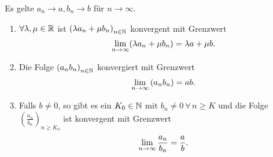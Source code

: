 \documentclass[../ana1.tex]{subfiles}
\begin{document}
\begin{satz}
	Es gelte \(a_n\rightarrow a, b_n \rightarrow b \) für \(n\rightarrow\infty \).
	\begin{enumerate}
		\item \(\forall \lambda, \mu \in\mathbb{R} \) ist \( {(\lambda a_n + \mu b_n)}_{n\in\mathbb{N}} \) konvergent mit Grenzwert
		\[\lim\limits_{n\rightarrow\infty} (\lambda a_n + \mu b_n) = \lambda a + \mu b. \]
		\item Die Folge \( {(a_n b_n)}_{n\in\mathbb{N}} \) konvergiert mit Grenzwert
		\[\lim\limits_{n\rightarrow\infty} {(a_n b_n)} = ab. \]
		\item Falls \(b\neq 0 \), so gibt es ein \(K_0 \in\mathbb{N} \) mit \(b_n \neq 0 \, \forall \, n\geq K \) und die Folge \( {\left(\frac{a_n}{b_n}\right)}_{n\geq K_0} \) ist konvergent mit Grenzwert
		\[\lim\limits_{n\rightarrow\infty} \frac{a_n}{b_n} = \frac{a}{b}. \]
	\end{enumerate}
\end{satz}
\end{document}
